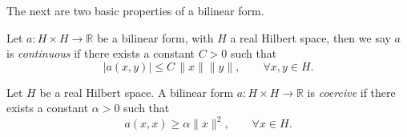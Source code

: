 The next are two basic properties of a bilinear form.

\begin{definition} Let $a:H\times H \rightarrow \mathbb{R}$ be a bilinear form, with $H$ a real Hilbert space, then we say $a$ is \emph{continuous} if there exists a constant $C>0$ such that $$|a(x,y)|\leq C\,\|x\|\|y\|,\qquad\forall x,y\in H.$$
\end{definition}
\begin{definition}
Let $H$ be a real Hilbert space. A bilinear form $a:H\times H\rightarrow \mathbb{R}$ is \emph{coercive} if there exists a constant $\alpha>0$ such that
$$a(x,x)\geq \alpha \|x\|^2,\qquad \forall x\in H.$$
\end{definition}


